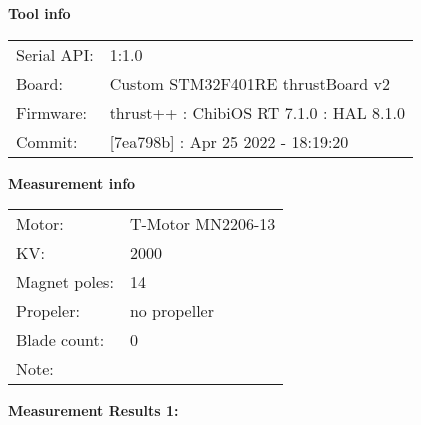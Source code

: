 \documentclass[10pt]{article}
\begin{document}
\noindent
{\large \bf Tool info}
\vspace{3mm}

\noindent
\begin{tabular}{ll}
Serial API:  & 1:1.0\\ 
Board:       & Custom STM32F401RE thrustBoard v2\\ 
Firmware:    & thrust++ : ChibiOS RT 7.1.0 : HAL 8.1.0\\ 
Commit:      & [7ea798b] : Apr 25 2022 - 18:19:20
\end{tabular}
\vspace{3mm}

\noindent
{\large \bf Measurement info}
\vspace{3mm}

\noindent
\begin{tabular}{ll}
Motor:        & T-Motor MN2206-13\\ 
KV:           & 2000\\ 
Magnet poles: & 14\\ 
Propeler:     & no propeller\\ 
Blade count:  & 0\\ 
Note:         & 
\end{tabular}

\vspace{3mm}

\noindent
{\large \bf Measurement Results 1:}
\vspace{3mm}
\end{document}
